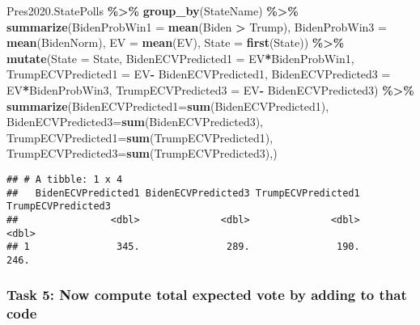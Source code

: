 \documentclass[
]{article}
\newenvironment{Shaded}{\begin{snugshade}}{\end{snugshade}}
\newcommand{\AttributeTok}[1]{\textcolor[rgb]{0.13,0.29,0.53}{#1}}
\newcommand{\FunctionTok}[1]{\textcolor[rgb]{0.13,0.29,0.53}{\textbf{#1}}}
\newcommand{\NormalTok}[1]{#1}
\newcommand{\SpecialCharTok}[1]{\textcolor[rgb]{0.81,0.36,0.00}{\textbf{#1}}}
\begin{document}
\begin{Shaded}
\begin{Highlighting}[]
\NormalTok{Pres2020.StatePolls }\SpecialCharTok{\%\textgreater{}\%}  
  \FunctionTok{group\_by}\NormalTok{(StateName) }\SpecialCharTok{\%\textgreater{}\%}
    \FunctionTok{summarize}\NormalTok{(}\AttributeTok{BidenProbWin1 =} \FunctionTok{mean}\NormalTok{(Biden }\SpecialCharTok{\textgreater{}}\NormalTok{ Trump),}
              \AttributeTok{BidenProbWin3 =} \FunctionTok{mean}\NormalTok{(BidenNorm),}
              \AttributeTok{EV =} \FunctionTok{mean}\NormalTok{(EV),}
              \AttributeTok{State =} \FunctionTok{first}\NormalTok{(State)) }\SpecialCharTok{\%\textgreater{}\%}
    \FunctionTok{mutate}\NormalTok{(}\AttributeTok{State =}\NormalTok{ State,}
              \AttributeTok{BidenECVPredicted1 =}\NormalTok{ EV}\SpecialCharTok{*}\NormalTok{BidenProbWin1,}
              \AttributeTok{TrumpECVPredicted1 =}\NormalTok{ EV}\SpecialCharTok{{-}}\NormalTok{ BidenECVPredicted1,}
              \AttributeTok{BidenECVPredicted3 =}\NormalTok{ EV}\SpecialCharTok{*}\NormalTok{BidenProbWin3,}
              \AttributeTok{TrumpECVPredicted3 =}\NormalTok{ EV}\SpecialCharTok{{-}}\NormalTok{ BidenECVPredicted3) }\SpecialCharTok{\%\textgreater{}\%}
  \FunctionTok{summarize}\NormalTok{(}\AttributeTok{BidenECVPredicted1=}\FunctionTok{sum}\NormalTok{(BidenECVPredicted1),}
            \AttributeTok{BidenECVPredicted3=}\FunctionTok{sum}\NormalTok{(BidenECVPredicted3),}
            \AttributeTok{TrumpECVPredicted1=}\FunctionTok{sum}\NormalTok{(TrumpECVPredicted1),}
            \AttributeTok{TrumpECVPredicted3=}\FunctionTok{sum}\NormalTok{(TrumpECVPredicted3),)}
\end{Highlighting}
\end{Shaded}

\begin{verbatim}
## # A tibble: 1 x 4
##   BidenECVPredicted1 BidenECVPredicted3 TrumpECVPredicted1 TrumpECVPredicted3
##                <dbl>              <dbl>              <dbl>              <dbl>
## 1               345.               289.               190.               246.
\end{verbatim}

\subsubsection{Task 5: Now compute total expected vote by adding to that
code}\label{task-5-now-compute-total-expected-vote-by-adding-to-that-code}
\end{document}
